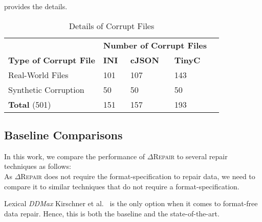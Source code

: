 \documentclass[acmsmall,screen,review,anonymous]{acmart}
\newcommand{\Formatfree}{Format-free\xspace}
\newcommand{\formatfree}{format-free\xspace}
\newcommand{\dtask}{data repair\xspace}
\newcommand{\approach}{\textsc{$\Delta$Repair}\xspace}
\newcommand{\ddmax}{\textit{DDMax}\xspace}
\newcommand{\drepair}{\approach}
\begin{document}
 provides the details.

%
\begin{table}[!tbp]\centering
\caption{Details of Corrupt Files}
\begin{tabular}{|p{4cm}|p{2cm}|p{2cm}|p{2cm}|p{2cm}|}
\hline
&  \multicolumn{3}{c|}{\textbf{Number of Corrupt Files}}  \\
\textbf{Type of Corrupt File} & \textbf{INI} & \textbf{cJSON} & \textbf{TinyC} \\
\hline
Real-World Files & 101 & 107 & 143 \\
Synthetic Corruption & 50 & 50    & 50 \\
\hline
\textbf{Total } (501) & 151 & 157    & 193 \\
\hline
\end{tabular}
\label{tab:inputdetails}
\end{table}

\subsection{Baseline Comparisons}
In this work, we compare the performance of \drepair to several repair
techniques as follows:\\

\noindent{\textbf{\Formatfree}.}
As \drepair does not require the format-specification to repair data, we
need to compare it to similar techniques that do not require a
format-specification.
\begin{description}[wide]

\item[\textbf{(1) Lexical \ddmax:}] Lexical \ddmax Kirschner et al.~\cite{kirschner2020debugging}
  is the only option when it comes to \formatfree \dtask. Hence, this is
  both the baseline and the state-of-the-art.
\end{description}
\end{document}
